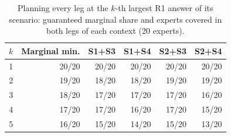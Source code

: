 \begin{table}[tb]
\centering
\caption{Planning every leg at the $k$-th largest R1 answer of its scenario: guaranteed marginal share and experts covered in both legs of each context (20 experts).}
\label{tab:coverage-v10}
\scriptsize\setlength{\tabcolsep}{3pt}
\begin{tabular}{@{}rrrrrr@{}}
\toprule
$k$ & Marginal min. & S1+S3 & S1+S4 & S2+S3 & S2+S4\\\midrule
1 & 20/20 & 20/20 & 20/20 & 20/20 & 20/20\\
2 & 19/20 & 18/20 & 18/20 & 19/20 & 19/20\\
3 & 18/20 & 17/20 & 17/20 & 17/20 & 16/20\\
4 & 17/20 & 17/20 & 16/20 & 17/20 & 15/20\\
5 & 16/20 & 15/20 & 14/20 & 15/20 & 13/20\\
\bottomrule
\end{tabular}
\end{table}
